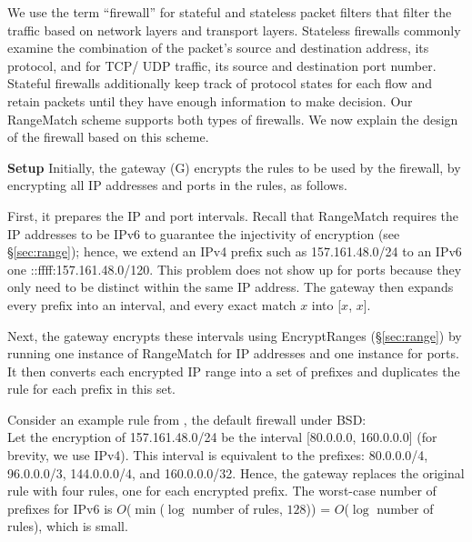 We use the term ``firewall'' for stateful and stateless packet filters that filter the traffic based on network layers and transport layers. Stateless firewalls commonly examine the combination of the packet's source and destination address, its protocol, and for TCP/ UDP traffic, its source and destination port number. Stateful firewalls additionally keep track of protocol states for each flow and retain packets until they have enough information to make decision. 
Our RangeMatch scheme supports both types of firewalls. We now explain the design of the firewall based on this scheme.

\noindent\textbf{Setup} Initially, the gateway (G) encrypts the rules to be used by the firewall, by encrypting all IP addresses and ports in the rules, as follows.

First, it prepares the IP and port intervals. Recall that RangeMatch requires the IP addresses to be IPv6 to guarantee the injectivity of encryption (see \S\ref{sec:range}); hence, we extend an IPv4 prefix  such as 157.161.48.0/24 to an IPv6 one  ::ffff:157.161.48.0/120. 
This problem does not show up for ports because they only need to be distinct within the same IP address.
The gateway then expands every prefix into an interval, and every exact match $x$ into [$x$, $x$]. 

Next, the gateway encrypts these intervals using EncryptRanges (\S\ref{sec:range}) by running one instance of RangeMatch for IP addresses and one instance for ports.
It then converts each encrypted IP range into a set of prefixes and duplicates the rule for each prefix in this set. 

Consider an example rule from  , the 
default firewall under BSD:
  \\ 
Let the encryption of 157.161.48.0/24 be the interval [80.0.0.0, 160.0.0.0] (for brevity, we use IPv4). 
This interval is equivalent to the prefixes: 80.0.0.0/4, 96.0.0.0/3, 144.0.0.0/4, and 160.0.0.0/32. 
Hence, the gateway replaces the original rule with four rules, one for each encrypted prefix. 
The worst-case number of prefixes for IPv6 is $O$($\min$($\log$ number of rules, $128$)) = $O$($\log$ number of rules), 
which is small. 







